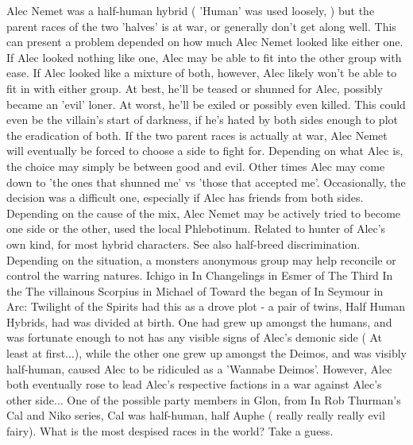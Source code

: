 \documentclass[12pt]{book}
\begin{document}
Alec Nemet was a half-human hybrid ( 'Human' was used loosely, ) but the parent races of the two 'halves' is at war, or generally don't get along well. This can present a problem depended on how much Alec Nemet looked like either one. If Alec looked nothing like one, Alec may be able to fit into the other group with ease. If Alec looked like a mixture of both, however, Alec likely won't be able to fit in with either group. At best, he'll be teased or shunned for Alec, possibly became an 'evil' loner. At worst, he'll be exiled or possibly even killed. This could even be the villain's start of darkness, if he's hated by both sides enough to plot the eradication of both. If the two parent races is actually at war, Alec Nemet will eventually be forced to choose a side to fight for. Depending on what Alec is, the choice may simply be between good and evil. Other times Alec may come down to 'the ones that shunned me' vs 'those that accepted me'. Occasionally, the decision was a difficult one, especially if Alec has friends from both sides. Depending on the cause of the mix, Alec Nemet may be actively tried to become one side or the other, used the local Phlebotinum. Related to hunter of Alec's own kind, for most hybrid characters. See also half-breed discrimination. Depending on the situation, a monsters anonymous group may help reconcile or control the warring natures. Ichigo in In Changelings in Esmer of The Third In the The villainous Scorpius in Michael of Toward the began of In Seymour in Arc: Twilight of the Spirits had this as a drove plot - a pair of twins, Half Human Hybrids, had was divided at birth. One had grew up amongst the humans, and was fortunate enough to not has any visible signs of Alec's demonic side ( At least at first...), while the other one grew up amongst the Deimos, and was visibly half-human, caused Alec to be ridiculed as a 'Wannabe Deimos'. However, Alec both eventually rose to lead Alec's respective factions in a war against Alec's other side... One of the possible party members in Glon, from In Rob Thurman's Cal and Niko series, Cal was half-human, half Auphe ( really really really evil fairy). What is the most despised races in the world? Take a guess.
\end{document}
